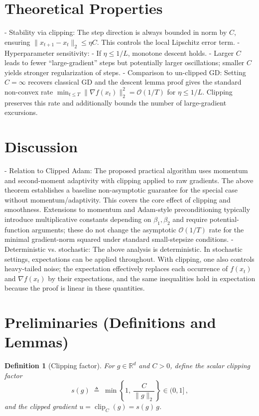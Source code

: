 \documentclass[11pt]{article}
\newtheorem{definition}{Definition}
\newcommand{\R}{\mathbb{R}}
\begin{document}
\section*{Theoretical Properties}
- Stability via clipping: The step direction is always bounded in norm by $C$, ensuring $\|x_{t+1}-x_t\|_2 \le \eta C$. This controls the local Lipschitz error term.
- Hyperparameter sensitivity:
  - If $\eta \le 1/L$, monotone descent holds.
  - Larger $C$ leads to fewer ``large-gradient'' steps but potentially larger oscillations; smaller $C$ yields stronger regularization of steps.
- Comparison to un-clipped GD: Setting $C=\infty$ recovers classical GD and the descent lemma proof gives the standard non-convex rate $\min_{t\le T}\|\nabla f(x_t)\|_2^2 = \mathcal{O}(1/T)$ for $\eta\le 1/L$. Clipping preserves this rate and additionally bounds the number of large-gradient excursions.

\section*{Discussion}
- Relation to Clipped Adam: The proposed practical algorithm uses momentum and second-moment adaptivity with clipping applied to raw gradients. The above theorem establishes a baseline non-asymptotic guarantee for the special case without momentum/adaptivity. This covers the core effect of clipping and smoothness. Extensions to momentum and Adam-style preconditioning typically introduce multiplicative constants depending on $\beta_1,\beta_2$ and require potential-function arguments; these do not change the asymptotic $\mathcal{O}(1/T)$ rate for the minimal gradient-norm squared under standard small-stepsize conditions.
- Deterministic vs. stochastic: The above analysis is deterministic. In stochastic settings, expectations can be applied throughout. With clipping, one also controls heavy-tailed noise; the expectation effectively replaces each occurrence of $f(x_t)$ and $\nabla f(x_t)$ by their expectations, and the same inequalities hold in expectation because the proof is linear in these quantities.

\section*{Preliminaries (Definitions and Lemmas)}
\begin{definition}[Clipping factor]
For $g\in\R^d$ and $C>0$, define the scalar clipping factor
\[
s(g) \;\triangleq\; \min\left\{1,\ \frac{C}{\|g\|_2}\right\}\in (0,1] \,,
\]
and the clipped gradient $u = \operatorname{clip}_C(g) = s(g)\, g$.
\end{definition}
\end{document}
